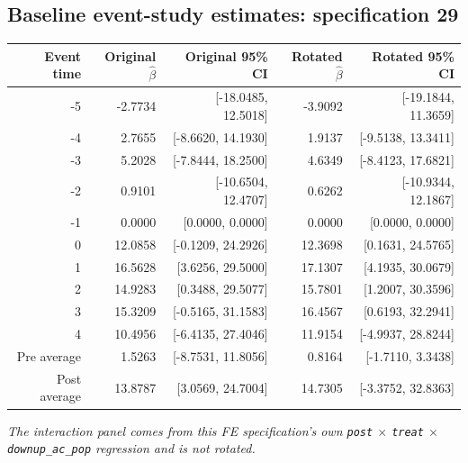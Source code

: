 \documentclass[10pt]{article}
\begin{document}
\subsection*{Baseline event-study estimates: specification 29}
\begin{center}
\scriptsize
\begin{tabular}{r rr rr}
\toprule
Event time & Original $\hat\beta$ & Original 95\% CI & Rotated $\hat\beta$ & Rotated 95\% CI \\
\midrule
-5 & -2.7734 & [-18.0485, 12.5018] & -3.9092 & [-19.1844, 11.3659] \\
-4 & 2.7655 & [-8.6620, 14.1930] & 1.9137 & [-9.5138, 13.3411] \\
-3 & 5.2028 & [-7.8444, 18.2500] & 4.6349 & [-8.4123, 17.6821] \\
-2 & 0.9101 & [-10.6504, 12.4707] & 0.6262 & [-10.9344, 12.1867] \\
-1 & 0.0000 & [0.0000, 0.0000] & 0.0000 & [0.0000, 0.0000] \\
0 & 12.0858 & [-0.1209, 24.2926] & 12.3698 & [0.1631, 24.5765] \\
1 & 16.5628 & [3.6256, 29.5000] & 17.1307 & [4.1935, 30.0679] \\
2 & 14.9283 & [0.3488, 29.5077] & 15.7801 & [1.2007, 30.3596] \\
3 & 15.3209 & [-0.5165, 31.1583] & 16.4567 & [0.6193, 32.2941] \\
4 & 10.4956 & [-6.4135, 27.4046] & 11.9154 & [-4.9937, 28.8244] \\
\midrule
Pre average & 1.5263 & [-8.7531, 11.8056] & 0.8164 & [-1.7110, 3.3438] \\
Post average & 13.8787 & [3.0569, 24.7004] & 14.7305 & [-3.3752, 32.8363] \\
\bottomrule
\end{tabular}
\end{center}
\medskip
\textit{The interaction panel comes from this FE specification's own \texttt{post} $\times$ \texttt{treat} $\times$ \texttt{downup\_ac\_pop} regression and is not rotated.}
\clearpage
\end{document}
